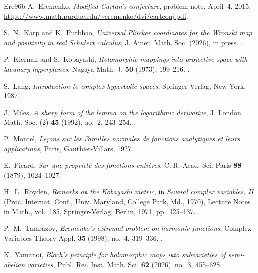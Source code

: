 \documentclass[12pt,letterpaper,reqno]{amsart}
\theoremstyle{definition}
\numberwithin{equation}{section}
\begin{document}
\begin{thebibliography}{Ere96b}
		A.~Eremenko, \emph{Modified Cartan's conjecture}, problem note, April~4, 2015.
		\url{https://www.math.purdue.edu/~eremenko/dvi/cartconj.pdf}.
		
S.~N.~Karp and K.~Purbhoo, \emph{Universal Pl\"ucker coordinates for
    the Wronski map and positivity in real Schubert calculus},
J. Amer. Math. Soc. (2026), in press.
.

		
		P.~Kiernan and S.~Kobayashi, \emph{Holomorphic mappings into projective
			space with lacunary hyperplanes}, Nagoya Math. J. \textbf{50} (1973),
		199--216. .
		
		S.~Lang, \emph{Introduction to complex hyperbolic spaces}, Springer-Verlag,
		New York, 1987. .
		
		J.~Miles, \emph{A sharp form of the lemma on the logarithmic derivative},
		J. London Math. Soc. (2) \textbf{45} (1992), no.~2, 243--254.
		.
		
		
P.~Montel, \emph{Le\c{c}ons sur les Familles normales
    de fonctions analytiques et leurs applications},
Paris, Gauthier-Villars, 1927.

        E.~Picard, \emph{Sur une propri\'et\'e des fonctions enti\`eres},
        C. R. Acad. Sci. Paris \textbf{88} (1879), 1024--1027.
		
		H.~L.~Royden, \emph{Remarks on the Kobayashi metric}, in
		\emph{Several complex variables, II} (Proc. Internat. Conf., Univ.
		Maryland, College Park, Md., 1970), Lecture Notes in Math., vol.~185,
		Springer-Verlag, Berlin, 1971, pp.~125--137.
		.
		
		P.~M.~Tamrazov, \emph{Eremenko's extremal problem on harmonic functions},
		Complex Variables Theory Appl. \textbf{35} (1998), no.~4, 319--336.
		.
		
		K.~Yamanoi, \emph{Bloch's principle for holomorphic maps into
			subvarieties of semi-abelian varieties}, Publ. Res. Inst. Math. Sci.
		\textbf{62} (2026), no.~3, 455--628.
		.
		
	\end{thebibliography}
	\endgroup
\end{document}
